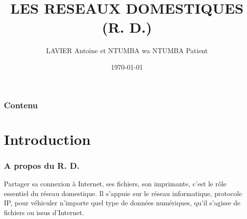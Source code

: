 \documentclass[handout]{beamer}
\begin{document}
\title{LES RESEAUX DOMESTIQUES (R. D.)}  
\author{LAVIER Antoine et NTUMBA wa NTUMBA Patient}
\date{\today} 

\begin{frame}
\titlepage
\end{frame} 

\begin{frame}
\frametitle{Contenu}
\tableofcontents
\end{frame} 




\section{Introduction}
\begin{frame}\frametitle{A propos du R. D.} 
Partager sa connexion à Internet, ses fichiers, son imprimante, c'est le rôle essentiel du réseau domestique. Il s'appuie sur le réseau informatique, protocole IP,  pour véhiculer n'importe quel type de données numériques, qu'il s'agisse de fichiers  ou issus d'Internet.
\end{frame}
\end{document}
